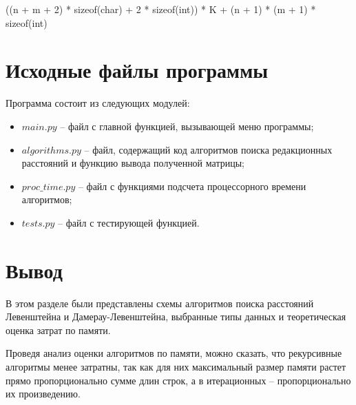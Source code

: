 ((n + m + 2) * sizeof(char) + 2 * sizeof(int)) * K + (n + 1) * (m + 1) * sizeof(int)\newline

\section{Исходные файлы программы}
Программа состоит из следующих модулей:
\begin{itemize}
	\item $main.py$ -- файл с главной функцией, вызывающей меню программы;
    \item $algorithms.py$ -- файл, содержащий код алгоритмов поиска редакционных расстояний и функцию вывода полученной матрицы;
    \item $proc\_time.py$ -- файл с функциями подсчета процессорного времени алгоритмов;
    \item $tests.py$ -- файл с тестирующей функцией.
    \newline
\end{itemize}

\section*{Вывод}
В этом разделе были представлены схемы алгоритмов поиска расстояний Левенштейна и Дамерау-Левенштейна, выбранные типы данных и теоретическая оценка затрат по памяти.

Проведя анализ оценки алгоритмов по памяти, можно сказать, что рекурсивные алгоритмы менее затратны, так как для них максимальный размер памяти растет прямо пропорционально сумме длин строк, а в итерационных -- пропорционально их произведению.